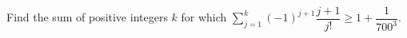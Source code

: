 Find the sum of positive integers $k$ for which $\displaystyle\sum_{j=1}^k(-1)^{j+1}\dfrac{j+1}{j!}\ge1+\dfrac{1}{700^3}$.
